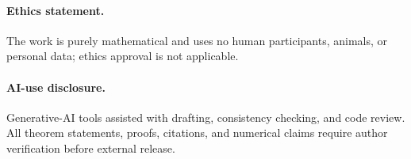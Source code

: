 \paragraph{Ethics statement.}
The work is purely mathematical and uses no human participants, animals, or
personal data; ethics approval is not applicable.

\paragraph{AI-use disclosure.}
Generative-AI tools assisted with drafting, consistency checking, and code
review.  All theorem statements, proofs, citations, and numerical claims
require author verification before external release.

